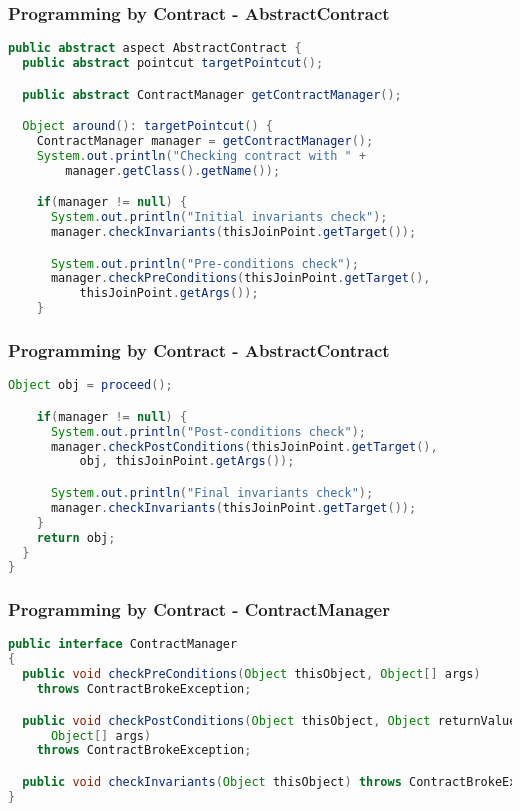 \documentclass[11pt]{beamer}
\begin{document}
\begin{frame}[fragile]
   \frametitle{Programming by Contract - AbstractContract}
{\scriptsize
\begin{lstlisting}[language=java]
public abstract aspect AbstractContract {
  public abstract pointcut targetPointcut();

  public abstract ContractManager getContractManager();

  Object around(): targetPointcut() {
    ContractManager manager = getContractManager();
    System.out.println("Checking contract with " +
        manager.getClass().getName());

    if(manager != null) {
      System.out.println("Initial invariants check");
      manager.checkInvariants(thisJoinPoint.getTarget());

      System.out.println("Pre-conditions check");
      manager.checkPreConditions(thisJoinPoint.getTarget(),
          thisJoinPoint.getArgs());
    }
\end{lstlisting}}
\end{frame}

\begin{frame}[fragile]
   \frametitle{Programming by Contract - AbstractContract}
{\scriptsize
\begin{lstlisting}[language=java]
    Object obj = proceed();

    if(manager != null) {
      System.out.println("Post-conditions check");
      manager.checkPostConditions(thisJoinPoint.getTarget(),
          obj, thisJoinPoint.getArgs());

      System.out.println("Final invariants check");
      manager.checkInvariants(thisJoinPoint.getTarget());
    }
    return obj;
  }
}
\end{lstlisting}}
\end{frame}

\begin{frame}[fragile]
   \frametitle{Programming by Contract - ContractManager}
{\tiny
\begin{lstlisting}[language=java]
public interface ContractManager
{
  public void checkPreConditions(Object thisObject, Object[] args)
    throws ContractBrokeException;

  public void checkPostConditions(Object thisObject, Object returnValue,
      Object[] args)
    throws ContractBrokeException;

  public void checkInvariants(Object thisObject) throws ContractBrokeException;
}
\end{lstlisting}}
\end{frame}
\end{document}
